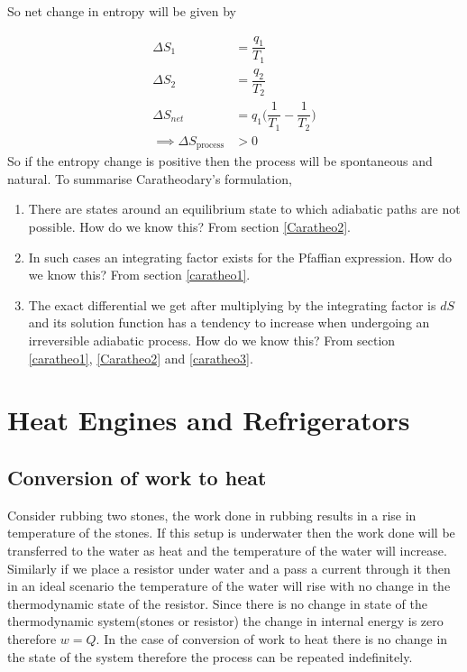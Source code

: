 \documentclass[12pt]{article}
\begin{document}
So net change in entropy will be given by

\begin{align*}
	\Delta S_1&=\dfrac{q_1}{T_1}\\
	\Delta S_2&=\dfrac{q_2}{T_2}\\
	\Delta S_{net}&=q_1\Bigg(\dfrac{1}{T_1}-\dfrac{1}{T_2}\Bigg)\\
	\implies \Delta S_{\text{process}}&>0
\end{align*}
So if the entropy change is positive then the process will be spontaneous and natural. To summarise Caratheodary's formulation, 
\begin{enumerate}
	\item There are states around an equilibrium state to which adiabatic paths are not possible. How do we know this? From section \ref{Caratheo2}.
	\item In such cases an integrating factor exists for the Pfaffian expression. How do we know this? From section \ref{caratheo1}.
	\item The exact differential we get after multiplying by the integrating factor is $dS$ and its solution function has  a tendency to increase when undergoing an irreversible adiabatic process. How do we know this? From section \ref{caratheo1}, \ref{Caratheo2} and \ref{caratheo3}.
\end{enumerate}

\section{Heat Engines and Refrigerators}
\subsection{Conversion of work to heat}
Consider rubbing two stones, the work done in rubbing results in a rise in temperature of the stones. If this setup is underwater then the work done will be transferred to the water as heat and the temperature of the water will increase. Similarly if we place a resistor under water and a pass a current through it then in an ideal scenario the temperature of the water will rise with no change in the thermodynamic state of the resistor. Since there is no change in state of the thermodynamic system(stones or resistor) the change in internal energy is zero therefore $w=Q$. In the case of conversion of work to heat there is no change in the state of the system therefore the process can be repeated indefinitely.\\
\end{document}
